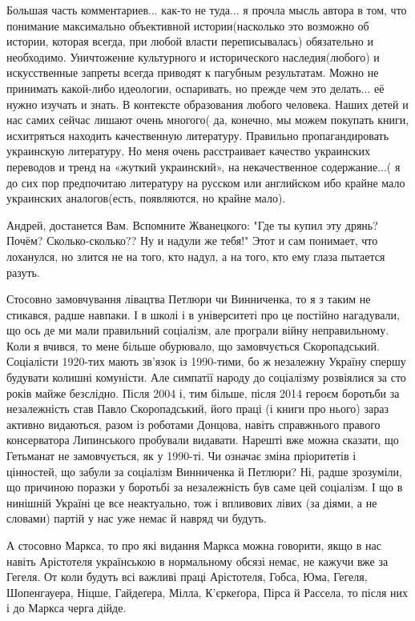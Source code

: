 \begin{itemize}
Большая часть комментариев... как-то не туда... я прочла мысль автора в том, что
понимание максимально объективной истории(насколько это возможно об истории,
которая всегда, при любой власти переписывалась) обязательно и необходимо.
Уничтожение культурного и исторического наследия(любого) и искусственные
запреты всегда приводят к пагубным результатам. Можно не принимать какой-либо
идеологии, оспаривать, но прежде чем это делать... её нужно изучать и знать. В
контексте образования любого человека. Наших детей и нас самих сейчас лишают
очень многого( да, конечно, мы можем покупать книги, исхитряться находить
качественную литературу. Правильно пропагандировать украинскую литературу. Но
меня очень расстраивает качество украинских переводов и тренд на «жуткий
украинский», на некачественное содержание...( я до сих пор предпочитаю литературу
на русском или английском ибо крайне мало украинских аналогов(есть, появляются,
но крайне мало).


Андрей, достанется Вам. Вспомните Жванецкого: "Где ты купил эту дрянь? Почём?
Сколько-сколько?? Ну и надули же тебя!" Этот и сам понимает, что лоханулся, но
злится не на того, кто надул, а на того, кто ему глаза пытается разуть.


Стосовно замовчування лівацтва Петлюри чи Винниченка, то я з таким не стикався,
радше навпаки. І в школі і в університеті про це постійно нагадували, що ось де
ми мали правильний соціалізм, але програли війну неправильному. Коли я вчився,
то мене більше обурювало, що замовчується Скоропадський. Соціалісти 1920-тих
мають зв'язок із 1990-тими, бо ж незалежну Україну спершу будувати колишні
комуністи. Але симпатії народу до соціалізму розвіялися за сто років майже
безслідно. Після 2004 і, тим більше, після 2014 героєм боротьби за незалежність
став Павло Скоропадський, його праці (і книги про нього) зараз активно
видаються, разом із роботами Донцова, навіть справжнього правого консерватора
Липинського пробували видавати. Нарешті вже можна сказати, що Гетьманат не
замовчується, як у 1990-ті. Чи означає зміна пріоритетів і цінностей, що забули
за соціалізм Винниченка й Петлюри? Ні, радше зрозуміли, що причиною поразки у
боротьбі за незалежність був саме цей соціалізм. І що в нинішній Україні це все
неактуально, тож і впливових лівих (за діями, а не словами) партій у нас уже
немає й навряд чи будуть.

А стосовно Маркса, то про які видання Маркса можна говорити, якщо в нас навіть
Арістотеля українською в нормальному обсязі немає, не кажучи вже за Гегеля. От
коли будуть всі важливі праці Арістотеля, Гобса, Юма, Гегеля, Шопенгауера,
Ніцше, Гайдеґера, Мілла, К’єркеґора, Пірса й Рассела, то після них і до Маркса
черга дійде.


\end{itemize}
